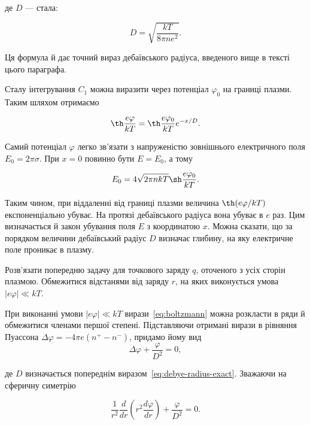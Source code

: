 де $D$ --- стала:

\begin{equation}\label{eq:debye-radius-exact}
	D = \sqrt{\frac{kT}{8\pi ne^2}}.
\end{equation}

Ця формула й дає точний вираз дебаївського радіуса, введеного вище в тексті цього параграфа.

Сталу інтегрування $C_1$ можна виразити через потенціал $\varphi_0$ на границі плазми. Таким шляхом отримаємо

\begin{equation}\label{eq:potential-distribution}
	\th\frac{e\varphi}{kT} = \th\frac{e\varphi_0}{kT} e^{-x/D}.
\end{equation}

Самий потенціал $\varphi$ легко зв'язати з напруженістю зовнішнього електричного поля $E_0 = 2\pi\sigma$. При $x = 0$ повинно бути $E = E_0$, а тому

\begin{equation}\label{eq:field-at-boundary}
	E_0 = 4\sqrt{2\pi nkT}\sh\frac{e\varphi_0}{kT}.
\end{equation}

Таким чином, при віддаленні від границі плазми величина $\th(e\varphi/kT)$ експоненціально убуває. На протязі дебаївського радіуса вона убуває в $e$ раз. Цим визначається й закон убування поля $E$ з координатою $x$. Можна сказати, що за порядком величини дебаївський радіус $D$ визначає глибину, на яку електричне поле проникає в плазму.

\begin{problem}\label{prb:point-charge-plasma}
	Розв'язати попередню задачу для точкового заряду $q$, оточеного з усіх сторін плазмою. Обмежитися відстанями від заряду $r$, на яких виконується умова $|e\varphi| \ll kT$.
\end{problem}

 При виконанні умови $|e\varphi| \ll kT$ вирази~\eqref{eq:boltzmann} можна розкласти в ряди й обмежитися членами першої степені. Підставляючи отримані вирази в рівняння Пуассона $\Delta\varphi = -4\pi e(n^+ - n^-)$,
придамо йому вид
\begin{equation}\label{eq:screened-poisson}
	\Delta\varphi + \frac{\varphi}{D^2} = 0,
\end{equation}

де $D$ визначається попереднім виразом~\eqref{eq:debye-radius-exact}. Зважаючи на сферичну симетрію

\begin{equation*}
	\frac{1}{r^2}\frac{d}{dr}\left(r^2\frac{d\varphi}{dr}\right) + \frac{\varphi}{D^2} = 0.
\end{equation*}

